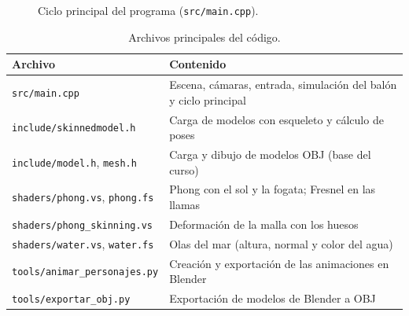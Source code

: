 \documentclass[12pt,letterpaper]{article}
\begin{document}
\begin{figure}[H]
  \centering
  \caption{Ciclo principal del programa (\texttt{src/main.cpp}).}
  \label{fig:arquitectura}
\end{figure}

\begin{table}[H]
  \centering
  \caption{Archivos principales del código.}
  \label{tab:archivos}
  \begin{tabularx}{\linewidth}{l X}
    \toprule
    \textbf{Archivo} & \textbf{Contenido} \\
    \midrule
    \texttt{src/main.cpp} & Escena, cámaras, entrada, simulación del balón y ciclo principal \\
    \texttt{include/skinnedmodel.h} & Carga de modelos con esqueleto y cálculo de poses \\
    \texttt{include/model.h}, \texttt{mesh.h} & Carga y dibujo de modelos OBJ (base del curso) \\
    \texttt{shaders/phong.vs}, \texttt{phong.fs} & Phong con el sol y la fogata; Fresnel en las llamas \\
    \texttt{shaders/phong\_skinning.vs} & Deformación de la malla con los huesos \\
    \texttt{shaders/water.vs}, \texttt{water.fs} & Olas del mar (altura, normal y color del agua) \\
    \texttt{tools/animar\_personajes.py} & Creación y exportación de las animaciones en Blender \\
    \texttt{tools/exportar\_obj.py} & Exportación de modelos de Blender a OBJ \\
    \bottomrule
  \end{tabularx}
\end{table}
\end{document}
